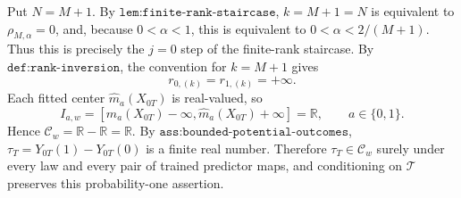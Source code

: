 Put \(N=M+1\). By \(\texttt{lem:finite-rank-staircase}\), \(k=M+1=N\) is equivalent to \(\rho_{M,\alpha}=0\), and, because \(0<\alpha<1\), this is equivalent to \(0<\alpha<2/(M+1)\). Thus this is precisely the \(j=0\) step of the finite-rank staircase. By \(\texttt{def:rank-inversion}\), the convention for \(k=M+1\) gives
\[r_{0,(k)}=r_{1,(k)}=+\infty.\]
Each fitted center \(\widehat m_a(X_{0T})\) is real-valued, so
\[I_{a,w}=[\widehat m_a(X_{0T})-\infty,\widehat m_a(X_{0T})+\infty]=\mathbb R,\qquad a\in\{0,1\}.\]
Hence \(\mathcal C_w=\mathbb R-\mathbb R=\mathbb R\). By \(\texttt{ass:bounded-potential-outcomes}\), \(\tau_T=Y_{0T}(1)-Y_{0T}(0)\) is a finite real number. Therefore \(\tau_T\in\mathcal C_w\) surely under every law and every pair of trained predictor maps, and conditioning on \(\mathcal T\) preserves this probability-one assertion.